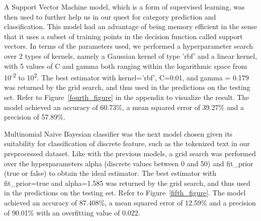 \documentclass[10pt,twocolumn,letterpaper]{article}
\begin{document}
A Support Vector Machine model, which is a form of supervised learning, was then used to further help us in our quest for category prediction and classification. This model had an advantage of being memory efficient in the sense that it uses a subset of training points in the decision function called support vectors. In terms of the parameters used, we performed a hyperparameter search over 2 types of kernels, namely a Gaussian kernel of type 'rbf' and a linear kernel, with 5 values of C and gamma both ranging within the logarithmic space from 10\textsuperscript{-2} to 10\textsuperscript{2}. The best estimator with kernel='rbf', C=0.01, and gamma = 0.179 was returned by the grid search, and thus used in the predictions on the testing set. Refer to Figure~\ref{fourth_figure} in the appendix to visualize the result. The model achieved an accuracy of 60.73\%, a mean squared error of 39.27\% and a precision of 57.89\%.\par
Multinomial Naive Bayesian classifier was the next model chosen given its suitability for classification of discrete feature, such as the tokenized text in our preprocessed dataset. Like with the previous models, a grid search was performed over the hyperparameters alpha (discrete values between 0 and 50) and fit\_prior (true or false) to obtain the ideal estimator. The best estimator with fit\_prior=true and alpha=1.585 was returned by the grid search, and thus used in the predictions on the testing set. Refer to Figure~\ref{fifth_figure}. The model achieved an accuracy of 87.408\%, a mean squared error of 12.59\% and a precision of 90.01\% with an overfitting value of 0.022. \par
\end{document}
